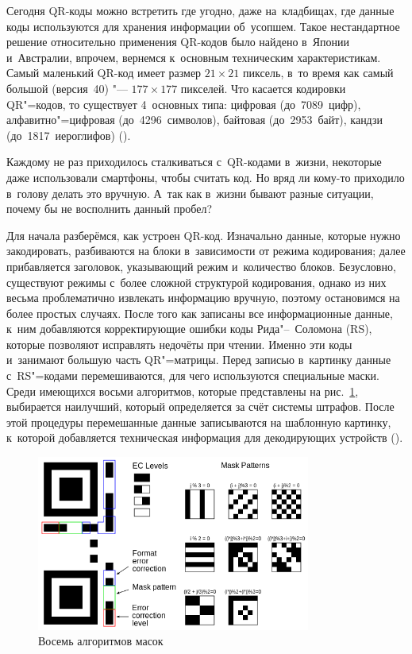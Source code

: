 \documentclass[final,pdftex]{../../template/epsilonj}
\begin{document}
Сегодня QR-коды можно встретить где угодно, даже на~кладбищах, где данные коды используются для хранения информации об~усопшем. Такое нестандартное решение относительно применения QR-кодов было найдено в~Японии и~Австралии, впрочем, вернемся к~основным техническим характеристикам.  Самый маленький QR-код имеет размер $21\times21$ пиксель, в~то время как самый большой (версия~40) "--- $177\times177$ пикселей. Что касается кодировки QR"=кодов, то существует 4~основных типа: цифровая (до~7089~цифр), алфавитно"=цифровая (до~4296~символов), байтовая (до~2953~байт), кандзи (до~1817~иероглифов) (\cite{WikiQRCodeRu}).

Каждому не раз приходилось сталкиваться с~QR-кодами в~жизни, некоторые даже использовали смартфоны, чтобы считать код. Но вряд ли кому-то приходило в~голову делать это вручную. А~так как в~жизни бывают разные ситуации, почему бы не восполнить данный пробел?

Для начала разберёмся, как устроен QR-код. Изначально данные, которые нужно закодировать, разбиваются на блоки в~зависимости от режима кодирования; далее прибавляется заголовок, указывающий режим и~количество блоков. Безусловно, существуют режимы с~более сложной структурой кодирования, однако из них весьма проблематично извлекать информацию вручную, поэтому остановимся на более простых случаях. После того как записаны все информационные данные, к~ним добавляются корректирующие ошибки коды Рида"--~Соломона (RS), которые позволяют исправлять недочёты при чтении. Именно эти коды и~занимают большую часть QR"=матрицы. Перед записью в~картинку данные с~RS"=кодами перемешиваются, для чего используются специальные маски. Среди имеющихся восьми алгоритмов, которые представлены на рис.~\ref{fig:8algs}, выбирается наилучший, который определяется за счёт системы штрафов. После этой процедуры перемешанные данные записываются на шаблонную картинку, к~которой добавляется техническая информация для декодирующих устройств (\cite{HabrQRcode}).

\begin{figure}[hbt]
			\includegraphics[width=90mm]{qr2.png}
			\caption{Восемь алгоритмов масок}\label{fig:8algs}
\end{figure}
\end{document}
